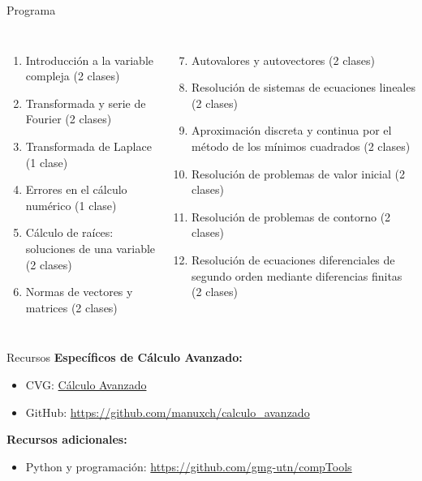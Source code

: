 \documentclass[9pt, aspectratio=169]{beamer}
\begin{document}
\begin{frame}{Programa}
	\begin{columns}[t]
		\cx
		\begin{enumerate}
			\item Introducción a la variable compleja (2 clases)
			\item Transformada y serie de Fourier (2 clases)
			\item Transformada de Laplace (1 clase)
			\item Errores en el cálculo numérico (1 clase)
			\item Cálculo de raíces: soluciones de una variable (2 clases)
			\item Normas de vectores y matrices (2 clases)
		\end{enumerate}
		\cx
		\begin{enumerate}
			\setcounter{enumi}{6}
			\item Autovalores y autovectores (2 clases)
			\item Resolución de sistemas de ecuaciones lineales (2 clases)
			\item Aproximación discreta y continua por el método de los mínimos cuadrados (2 clases)
			\item Resolución de problemas de valor inicial (2 clases)
			\item Resolución de problemas de contorno (2 clases)
			\item Resolución de ecuaciones diferenciales de segundo orden mediante diferencias finitas (2 clases)
		\end{enumerate}
	\end{columns}
	\vspace{1em}
	\begin{columns}[c]
		\cx
		\centering

		\cx
		\centering
	\end{columns}
\end{frame}

\begin{frame}{Recursos}
	\textbf{Específicos de Cálculo Avanzado:}
	\begin{itemize}
		\item CVG: \href{https://frlp.cvg.utn.edu.ar/course/view.php?id=189}{Cálculo Avanzado}
		\item GitHub: \url{https://github.com/manuxch/calculo_avanzado}
	\end{itemize}

	\textbf{Recursos adicionales:}
	\begin{itemize}
		\item Python y programación: \url{https://github.com/gmg-utn/compTools}
	\end{itemize}
\end{frame}
\end{document}
